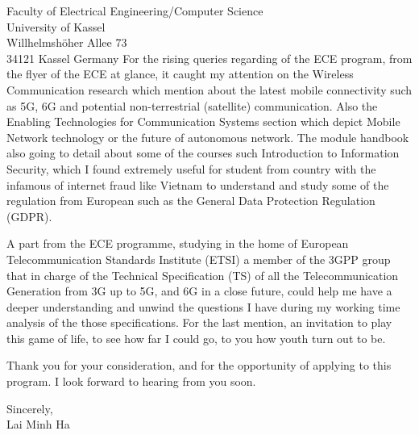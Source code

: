 \documentclass[a4paper,12pt]{letter}
\begin{document}
\begin{letter}{
    Faculty of Electrical Engineering/Computer Science
    \\ University of Kassel
    \\ Willhelmshöher Allee 73
    \\ 34121 Kassel Germany
}
For the rising queries regarding of the ECE program, from the flyer of the ECE at glance, it caught my attention on the Wireless Communication research which mention about the latest mobile connectivity such as 5G, 6G and potential non-terrestrial (satellite) communication. Also the Enabling Technologies for Communication Systems section which depict Mobile Network technology or the future of autonomous network. The module handbook also going to detail about some of the courses such Introduction to Information Security, which I found extremely useful for student from country with the infamous of internet fraud like Vietnam to understand and study some of the regulation from European such as the General Data Protection Regulation (GDPR).

A part from the ECE programme, studying in the home of European Telecommunication Standards Institute (ETSI) a member of the 3GPP group that in charge of the Technical Specification (TS) of all the Telecommunication Generation from 3G up to 5G, and 6G in a close future, could help me have a deeper understanding and unwind the questions I have during my working time analysis of the those specifications. For the last mention, an invitation to play this game of life, to see how far I could go, to you how youth turn out to be.

Thank you for your consideration, and for the opportunity of applying to this program. I look forward to hearing from you soon.


\begin{flushright}
    Sincerely,
    \\ Lai Minh Ha
\end{flushright}

\end{letter}
\end{document}
